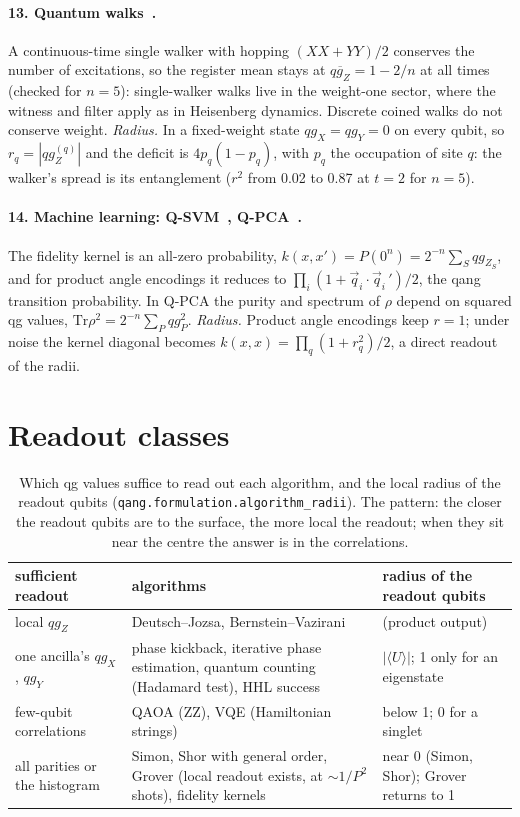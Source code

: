 \documentclass[11pt]{article}
\newcommand{\q}[1]{qg_{#1}}
\newcommand{\qZ}{qg_Z}
\newcommand{\qX}{qg_X}
\newcommand{\qY}{qg_Y}
\begin{document}
\paragraph{13. Quantum walks~\cite{farhi1998walk}.} A continuous-time single walker with hopping $(XX+YY)/2$
conserves the number of excitations, so the register mean stays at $\overline{\qZ}=1-2/n$ at all times (checked
for $n=5$): single-walker walks live in the weight-one sector, where the witness and filter apply as in Heisenberg
dynamics. Discrete coined walks do not conserve weight. \emph{Radius.} In a fixed-weight state $\qX=\qY=0$ on every qubit, so $r_q=|\qZ^{(q)}|$
and the deficit is $4p_q(1-p_q)$, with $p_q$ the occupation of site $q$: the walker's spread is its entanglement
($r^2$ from 0.02 to 0.87 at $t=2$ for $n=5$).

\paragraph{14. Machine learning: Q-SVM~\cite{havlicek2019}, Q-PCA~\cite{lloyd2014qpca}.} The fidelity kernel is an
all-zero probability, $k(x,x')=P(0^n)=2^{-n}\sum_S\q{Z_S}$, and for product angle encodings it reduces to
$\prod_i(1+\vec q_i\cdot\vec q_i\,')/2$, the qang transition probability. In Q-PCA the purity and spectrum of $\rho$
depend on squared qg values, $\mathrm{Tr}\rho^2=2^{-n}\sum_P\q{P}^2$. \emph{Radius.} Product angle encodings keep $r=1$;
under noise the kernel diagonal becomes $k(x,x)=\prod_q(1+r_q^2)/2$, a direct readout of the radii.

\section{Readout classes}

\begin{table}[h]
\centering\small
\caption{Which qg values suffice to read out each algorithm, and the local radius of the readout qubits
(\texttt{qang.formulation.algorithm\_radii}). The pattern: the closer the readout qubits are to the surface, the more
local the readout; when they sit near the centre the answer is in the correlations.}
\label{tab:readout}\medskip
\begin{tabular}{>{\raggedright\arraybackslash}p{3.6cm}>{\raggedright\arraybackslash}p{7.4cm}>{\raggedright\arraybackslash}p{3.4cm}}
\toprule
sufficient readout & algorithms & radius of the readout qubits \\
\midrule
local $\qZ$ & Deutsch--Jozsa, Bernstein--Vazirani & 1 (product output) \\
one ancilla's $\qX$, $\qY$ & phase kickback, iterative phase estimation, quantum counting (Hadamard test), HHL success & $|\langle U\rangle|$; 1 only for an eigenstate \\
few-qubit correlations & QAOA (ZZ), VQE (Hamiltonian strings) & below 1; 0 for a singlet \\
all parities or the histogram & Simon, Shor with general order, Grover (local readout exists, at $\sim1/P^2$ shots), fidelity kernels & near 0 (Simon, Shor); Grover returns to 1 \\
\bottomrule
\end{tabular}
\end{table}
\end{document}
